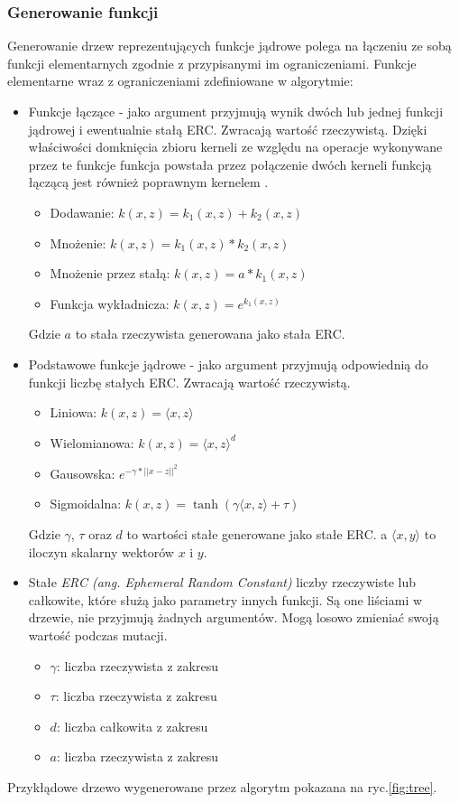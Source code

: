 \subsubsection{Generowanie funkcji}
Generowanie drzew reprezentujących funkcje jądrowe polega na łączeniu ze sobą funkcji elementarnych zgodnie z  przypisanymi im ograniczeniami.
Funkcje elementarne wraz z ograniczeniami zdefiniowane w algorytmie:
\begin{itemize}
\item Funkcje łączące - jako argument przyjmują wynik dwóch lub jednej funkcji jądrowej i ewentualnie stałą ERC. Zwracają wartość rzeczywistą. Dzięki właściwości domknięcia zbioru kerneli ze względu na operacje wykonywane przez te funkcje funkcja powstała przez połączenie dwóch kerneli funkcją łączącą jest również poprawnym kernelem \cite{Shawe-Taylor:2004:KMP:975545}.
	\begin{itemize}
	\item Dodawanie: $ k(x, z) = k_1(x,z) + k_2(x,z) $
	\item Mnożenie: $ k(x, z) = k_1(x,z) * k_2(x,z) $	
	\item Mnożenie przez stałą: $ k(x, z) = a * k_1(x,z) $
	\item Funkcja wykładnicza: $ k(x, z) = e ^{k_1(x,z)} $
	\end{itemize}
	Gdzie $ a $ to stała rzeczywista generowana jako stała ERC.
\item Podstawowe funkcje jądrowe - jako argument przyjmują odpowiednią do funkcji liczbę stałych ERC. Zwracają wartość rzeczywistą.
	\begin{itemize}
	\item Liniowa: $ k(x, z) = \langle x,z \rangle $	
	\item Wielomianowa: $ k(x, z) = \langle x,z \rangle ^d $
	\item Gausowska: $ e^{-\gamma*||x-z||^2} $	
	\item Sigmoidalna: $ k(x, z) = \tanh(\gamma \langle x,z \rangle + \tau) $
	\end{itemize}
	Gdzie $ \gamma $, $ \tau $ oraz $ d $ to wartości stałe generowane jako stałe ERC. a $ \langle x,y \rangle $ to iloczyn skalarny wektorów $x$ i $y$.
\item Stałe \textit{ERC (ang. Ephemeral Random Constant)} liczby rzeczywiste lub całkowite, które służą jako parametry innych funkcji. Są one liściami w drzewie, nie przyjmują żadnych argumentów. Mogą losowo zmieniać swoją wartość podczas mutacji.
	\begin{itemize}
	\item $ \gamma $: liczba rzeczywista z zakresu
	\item $ \tau $: liczba rzeczywista z zakresu
	\item $ d $: liczba całkowita z zakresu
	\item $ a $: liczba rzeczywista z zakresu
	\end{itemize}
\end{itemize}
Przykłądowe drzewo wygenerowane przez algorytm pokazana na ryc.\ref{fig:tree}.

